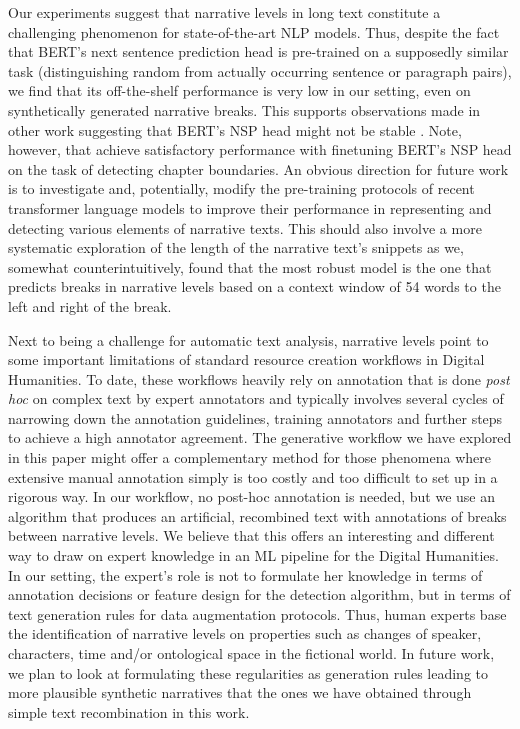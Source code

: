 \documentclass[10pt, a4paper]{article}
\begin{document}
Our experiments suggest that narrative levels in long text constitute a challenging phenomenon for state-of-the-art NLP models.
Thus, despite the fact that BERT's next sentence prediction head is pre-trained on a supposedly similar task (distinguishing random from actually occurring sentence or paragraph pairs), we find that its off-the-shelf performance is very low in our setting, even on synthetically generated narrative breaks. 
This supports observations made in other work suggesting that BERT's NSP head might not be stable \cite{liu2019roberta}. 
Note, however, that \cite{pethe-etal-2020-chapter} achieve satisfactory performance with finetuning  BERT's NSP head on the task of detecting chapter boundaries.
An obvious direction for future work is to investigate and, potentially, modify the pre-training protocols of recent transformer language models to improve their performance in representing and detecting various elements of narrative texts.
This should also involve a more systematic exploration of the length of the narrative text's snippets as we, somewhat counterintuitively, found that the most robust model is the one that predicts breaks in narrative levels based on a context window of 54 words to the left and right of the break.

Next to being a challenge for automatic text analysis, narrative levels point to some important limitations of  standard resource creation workflows in Digital Humanities.
To date, these workflows heavily rely on  annotation that is done \textit{post hoc} on complex text by expert annotators and typically involves several cycles of narrowing down the annotation guidelines, training annotators and further steps to achieve a high annotator agreement.
The generative workflow we have explored in this paper might offer a complementary method for those phenomena where extensive manual annotation simply is too costly  and too difficult to set up in a rigorous way.
In our workflow, no post-hoc annotation is needed, but we use an algorithm that produces an artificial, recombined text with annotations of breaks between narrative levels.
We believe that this offers an interesting and different way to draw on expert knowledge in an ML pipeline for the Digital Humanities. In our setting, the expert's role is not to formulate her knowledge in terms of annotation decisions or feature design for the detection algorithm, but in terms of text generation rules for data augmentation protocols.
Thus, human experts base the identification of narrative levels on properties such as changes of speaker, characters, time and/or ontological space in the fictional world. 
In future work, we plan to look at formulating these regularities as generation rules leading to more plausible synthetic narratives that the ones we have obtained through simple text recombination in this work.
\end{document}
